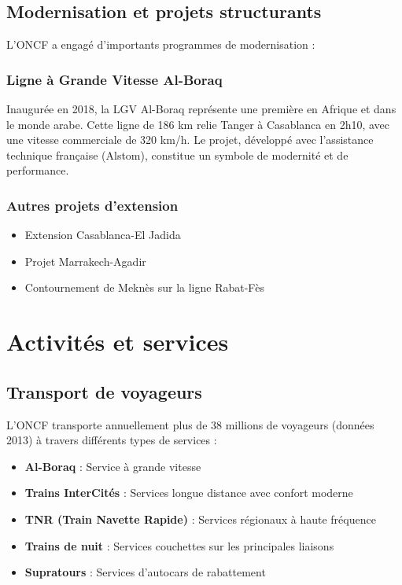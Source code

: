 \subsection{Modernisation et projets structurants}

L'ONCF a engagé d'importants programmes de modernisation :

\subsubsection{Ligne à Grande Vitesse Al-Boraq}
Inaugurée en 2018, la LGV Al-Boraq représente une première en Afrique et dans le monde arabe. Cette ligne de 186 km relie Tanger à Casablanca en 2h10, avec une vitesse commerciale de 320 km/h. Le projet, développé avec l'assistance technique française (Alstom), constitue un symbole de modernité et de performance.

\subsubsection{Autres projets d'extension}
\begin{itemize}
    \item Extension Casablanca-El Jadida
    \item Projet Marrakech-Agadir
    \item Contournement de Meknès sur la ligne Rabat-Fès
\end{itemize}

\section{Activités et services}

\subsection{Transport de voyageurs}

L'ONCF transporte annuellement plus de 38 millions de voyageurs (données 2013) à travers différents types de services :
\begin{itemize}
    \item \textbf{Al-Boraq} : Service à grande vitesse
    \item \textbf{Trains InterCités} : Services longue distance avec confort moderne
    \item \textbf{TNR (Train Navette Rapide)} : Services régionaux à haute fréquence
    \item \textbf{Trains de nuit} : Services couchettes sur les principales liaisons
    \item \textbf{Supratours} : Services d'autocars de rabattement
\end{itemize}


